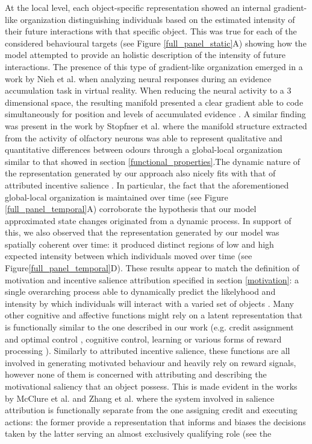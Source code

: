 At the local level, each object-specific representation showed an internal gradient-like organization distinguishing individuals based on the estimated intensity of their future interactions with that specific object. This was true for each of the considered behavioural targets (see Figure \ref{full_panel_static}A) showing how the model attempted to provide an holistic description of the intensity of future interactions. The presence of this type of gradient-like organization emerged in a work by Nieh et al. \cite{nieh2021geometry} when analyzing neural responses during an evidence accumulation task in virtual reality. When reducing the neural activity to a 3 dimensional space, the resulting manifold presented a clear gradient able to code simultaneously for position and levels of accumulated evidence \cite{nieh2021geometry}. A similar finding was present in the work by Stopfner et al. \cite{stopfer2003intensity} where the manifold structure extracted from the activity of olfactory neurons was able to represent qualitative and quantitative differences between odours through a global-local organization similar to that showed in section \ref{functional_properties}.The dynamic nature of the representation generated by our approach also nicely fits with that of attributed incentive salience \cite{toates1994comparing,robinson1993neural,zhang2009neural,tindell2009dynamic,berridge2012prediction}. In particular, the fact that the aforementioned global-local organization is maintained over time (see Figure \ref{full_panel_temporal}A) corroborate the hypothesis that our model approximated state changes originated from a dynamic process. In support of this, we also observed that the representation generated by our model was spatially coherent over time: it produced distinct regions of low and high expected intensity between which individuals moved over time (see Figure\ref{full_panel_temporal}D). These results appear to match the definition of motivation and incentive salience attribution specified in section \ref{motivation}: a single overarching process able to dynamically predict the likelyhood and intensity by which individuals will interact with a varied set of objects \cite{simpson2016behavioral,toates1994comparing,berridge2004motivation,zhang2009neural}. Many other cognitive and affective functions might rely on a latent representation that is functionally similar to the one described in our work (e.g. credit assignment and optimal control \cite{wang2018prefrontal, barto2004reinforcement}, cognitive control, learning \cite{skinner1965science} or various forms of reward processing \cite{schultz1997neural, schultz2000reward}). Similarly to attributed incentive salience, these functions are all involved in generating motivated behaviour and heavily rely on reward signals, however none of them is concerned with attributing and describing the motivational saliency that an object possess. This is made evident in the works by McClure et al. \cite{mcclure2003computational} and Zhang et al. \cite{zhang2009neural} where the system involved in salience attribution is functionally separate from the one assigning credit and executing actions: the former provide a representation that informs and biases the decisions taken by the latter serving an almost exclusively qualifying role (see the 